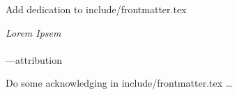 \begin{frontmatter}
\makefrontmatter                                                               


\begin{dedication}                                                             
    Add dedication to include/frontmatter.tex
\end{dedication}                                                               
\clearpage 


\begin{myepigraph} %
  \vfil                                                                        
  \vfil 
  \hfill {\it Lorem Ipsem} \\
  \vfil 
   \hfill \\
  \vfil 
  \hfill ---attribution
  \vfil 
\end{myepigraph}                                                               

\tableofcontents
\listoffigures  %
\listoftables   %

\begin{acknowledgements}                                                       
Do some acknowledging in include/frontmatter.tex \ldots
\end{acknowledgements}                                                         


\end{frontmatter}
